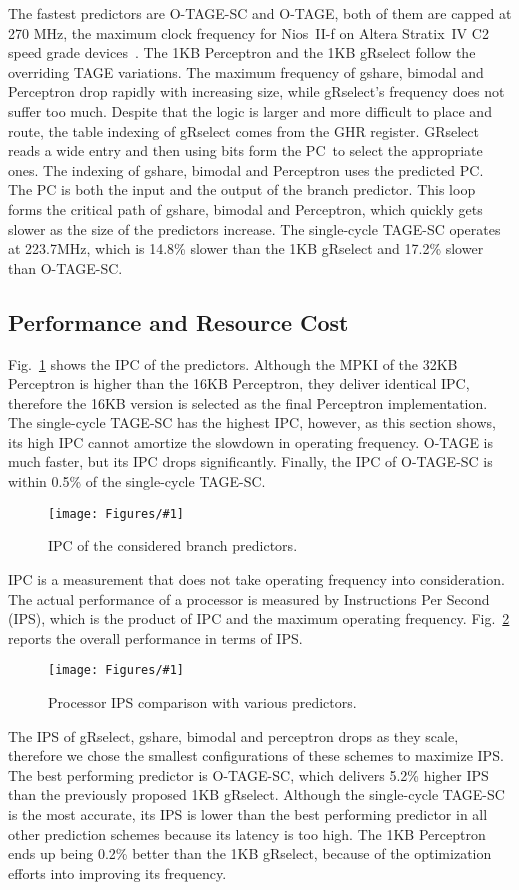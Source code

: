 \documentclass[conference]{IEEEtran}
\newcommand{\kfig}[4]{ %
        \begin{figure}[!t]
        \centering
        \texttt{[image: Figures/\#1]}
        \vspace{-1mm}
        \caption{#3}
        \label{#2}
        \end{figure}
}
\begin{document}
The fastest predictors are \mbox{O-TAGE-SC} and \mbox{O-TAGE}, both of them are capped at 270 MHz, the maximum clock frequency for Nios~II-f on Altera Stratix~IV C2 speed grade devices~\cite{niosfmax}. The 1KB Perceptron and the 1KB gRselect follow the overriding TAGE variations. The maximum frequency of gshare, bimodal and Perceptron drop rapidly with increasing size, while gRselect's frequency does not suffer too much. Despite that the logic is larger and more difficult to place and route,  the table indexing of gRselect comes from the GHR register. GRselect reads a wide entry and then using bits form the PC\ to select the appropriate ones. The indexing of gshare, bimodal and Perceptron uses  the predicted PC. The PC is both the input and the output of the branch predictor. This loop forms the critical path of gshare, bimodal and Perceptron, which quickly gets slower as the size of the predictors increase. The single-cycle \mbox{TAGE-SC} operates at 223.7MHz, which is 14.8\% slower than the 1KB gRselect and 17.2\% slower than \mbox{O-TAGE-SC}.

\subsection{Performance and Resource Cost}
\label{sec:eval:perf}
Fig.~\ref{fig:adipc} shows the IPC of the predictors. Although the MPKI of the 32KB Perceptron is higher than the 16KB Perceptron, they deliver identical IPC, therefore the 16KB version is selected as the final Perceptron implementation. The single-cycle \mbox{TAGE-SC} has the highest IPC, however, as this section shows, its high IPC cannot amortize the slowdown in operating frequency. \mbox{O-TAGE} is much faster, but its IPC drops significantly. Finally, the IPC of \mbox{O-TAGE-SC} is within 0.5\% of the single-cycle \mbox{TAGE-SC}.
\kfig{adipc.pdf}{fig:adipc}{IPC of the considered branch predictors.}{angle = 0, trim = 0.9in 2.9in 0.8in 2.9in, clip, width=0.5\textwidth}

IPC is a measurement that does not take operating frequency into consideration. The actual performance of a processor is measured by Instructions Per Second (IPS), which is the product of IPC and the maximum operating frequency. Fig.~\ref{fig:adips} reports the overall performance in terms of IPS.
\kfig{adips.pdf}{fig:adips}{Processor IPS comparison with various predictors.}{angle = 0, trim = 0.9in 2.7in 0.7in 2.6in, clip, width=0.5\textwidth}

The IPS of gRselect, gshare, bimodal and perceptron drops as they scale, therefore we chose the smallest configurations of these schemes to maximize IPS. The best performing predictor is \mbox{O-TAGE-SC}, which delivers 5.2\% higher IPS than the previously proposed 1KB gRselect. Although the single-cycle \mbox{TAGE-SC} is the most accurate, its IPS is lower than the best performing predictor in all other prediction schemes  because its latency is too high. The 1KB Perceptron ends up being 0.2\% better than the 1KB gRselect, because of the optimization efforts into improving its frequency. 
\end{document}
